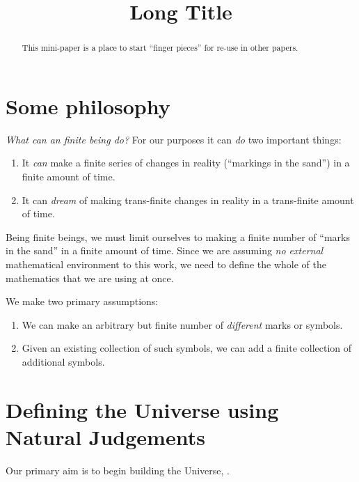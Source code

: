 \documentclass[a4paper,openany]{amsart}
\begin{document}
\sloppy

\title[Short Title]{Long Title}

%

\begin{abstract}
This mini-paper is a place to start ``finger pieces'' for re-use in other papers.
\end{abstract} 
\maketitle 
\tableofcontents 


\section{Some philosophy}

\emph{What can an finite being do?} For our purposes it can \emph{do} two important things:
\begin{enumerate}
\item It \emph{can} make a finite series of changes in reality (``markings in the sand'') in a finite amount of time.
\item It can \emph{dream} of making trans-finite changes in reality in a trans-finite amount of time.
\end{enumerate}

Being finite beings, we must limit ourselves to making a finite number of ``marks in the sand'' in a finite amount of time. Since we are assuming \emph{no external} mathematical environment to this work, we need to define the whole of the mathematics that we are using at once.

We make two primary assumptions:
\begin{enumerate}
\item We can make an arbitrary but finite number of \emph{different} marks or symbols.
\item Given an existing collection of such symbols, we can add a finite collection of additional symbols.
\end{enumerate}

\section{Defining the Universe using Natural Judgements}

Our primary aim is to begin building the Universe, \Universe{}{}.
\end{document}
